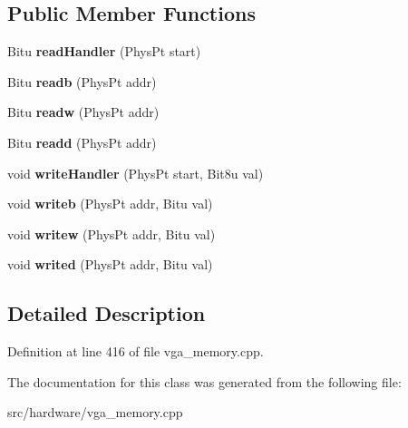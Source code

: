 \subsection*{Public Member Functions}
\begin{DoxyCompactItemize}
\item 
\hypertarget{classVGA__UnchainedVGA__Handler_a5de9a4081506d1b355ee928fa4e31201}{Bitu {\bfseries read\-Handler} (Phys\-Pt start)}\label{classVGA__UnchainedVGA__Handler_a5de9a4081506d1b355ee928fa4e31201}

\item 
\hypertarget{classVGA__UnchainedVGA__Handler_a1b0dc799e980e96f118df760279842ff}{Bitu {\bfseries readb} (Phys\-Pt addr)}\label{classVGA__UnchainedVGA__Handler_a1b0dc799e980e96f118df760279842ff}

\item 
\hypertarget{classVGA__UnchainedVGA__Handler_af4b4ff984ede83769e0b935164b1c682}{Bitu {\bfseries readw} (Phys\-Pt addr)}\label{classVGA__UnchainedVGA__Handler_af4b4ff984ede83769e0b935164b1c682}

\item 
\hypertarget{classVGA__UnchainedVGA__Handler_a6192137facf30fdbdf1a967c540c9431}{Bitu {\bfseries readd} (Phys\-Pt addr)}\label{classVGA__UnchainedVGA__Handler_a6192137facf30fdbdf1a967c540c9431}

\item 
\hypertarget{classVGA__UnchainedVGA__Handler_a2ff44c0c054b1aa0697374ae2fca666a}{void {\bfseries write\-Handler} (Phys\-Pt start, Bit8u val)}\label{classVGA__UnchainedVGA__Handler_a2ff44c0c054b1aa0697374ae2fca666a}

\item 
\hypertarget{classVGA__UnchainedVGA__Handler_a5c1bc86d9e0874e6b738440ab1a46cab}{void {\bfseries writeb} (Phys\-Pt addr, Bitu val)}\label{classVGA__UnchainedVGA__Handler_a5c1bc86d9e0874e6b738440ab1a46cab}

\item 
\hypertarget{classVGA__UnchainedVGA__Handler_a52dbbef8deba1e3f29ec5ff924742dff}{void {\bfseries writew} (Phys\-Pt addr, Bitu val)}\label{classVGA__UnchainedVGA__Handler_a52dbbef8deba1e3f29ec5ff924742dff}

\item 
\hypertarget{classVGA__UnchainedVGA__Handler_aad4069e3c9c64274ae4ccd03851b2ca6}{void {\bfseries writed} (Phys\-Pt addr, Bitu val)}\label{classVGA__UnchainedVGA__Handler_aad4069e3c9c64274ae4ccd03851b2ca6}

\end{DoxyCompactItemize}


\subsection{Detailed Description}


Definition at line 416 of file vga\-\_\-memory.\-cpp.



The documentation for this class was generated from the following file\-:\begin{DoxyCompactItemize}
\item 
src/hardware/vga\-\_\-memory.\-cpp\end{DoxyCompactItemize}
